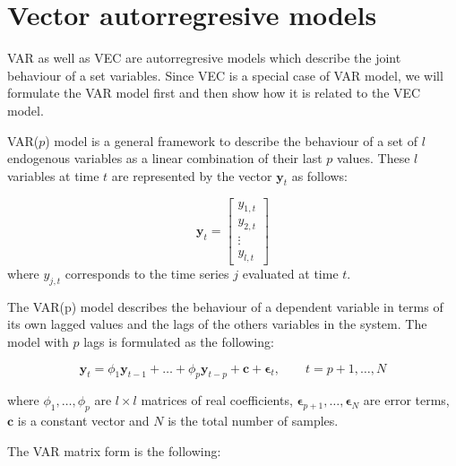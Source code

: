 
\section{Vector autorregresive models}\label{sec:varvec}

VAR as well as VEC are autorregresive models which describe the joint
behaviour of a set variables. Since VEC is a special case of VAR
model, we will formulate the VAR model first and then show how it is
related to the VEC model. 


VAR($p$) model is a general framework to describe
the behaviour of a set of $l$ endogenous variables as a linear
combination of their last $p$ values. These $l$ variables at time $t$
are represented by the vector $\mathbf{y}_t$ as follows:

\begin{equation}
\label{eq:variables}
\mathbf{y}_t = 
\begin{bmatrix} y_{1,t} \\
y_{2,t} \\
\vdots \\
y_{l,t}
\end{bmatrix}
\end{equation}
\noindent where $y_{j,t}$ corresponds to the time series $j$ evaluated at
time $t$.

The VAR(p) model describes the behaviour of a dependent variable in terms
of its own lagged values and the lags of the others variables in the
system. The model with $p$ lags is formulated as the following:

\begin{equation}
\label{eq:var}
 \mathbf{y}_t = \phi_1 \mathbf{y}_{t-1}  + \dots +   \phi_p\mathbf{y}_{t-p}
+ \mathbf{c} + \mathbf{\epsilon}_t, \qquad t=p+1, \dots, N
\end{equation}

\noindent where ${\phi_1,\dots,\phi_p}$ are $l \times l$ 
matrices of real coefficients, $\mathbf{\epsilon}_{p+1},\dots,\mathbf{\epsilon}_N$ are
error terms, $\mathbf{c}$ is a constant vector and $N$ is the total number of
samples.

The VAR matrix form is the following:

